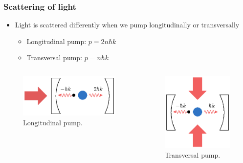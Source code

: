 \documentclass[pdflatex,compress]{beamer}
\begin{document}
\begin{frame}
\frametitle{Scattering of light}
\begin{itemize}
	\item Light is scattered differently when we pump longitudinally or transversally
	\begin{itemize}
		\item Longitudinal pump: $p = 2 n \hbar k$
		\item Transversal pump: $p = n \hbar k$
	\end{itemize}
\end{itemize}
\vspace{-2em}
\begin{columns}
\begin{figure}
\centering
\includegraphics[width=1\textwidth]{images/pump_long.eps}
\caption{Longitudinal pump.}
\end{figure}
\begin{figure}
\centering
\includegraphics[width=1\textwidth]{images/pump_trans.eps}
\caption{Transversal pump.}
\end{figure}
\end{columns}
\end{frame}
\end{document}
